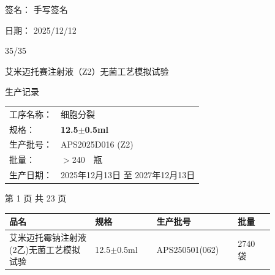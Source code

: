 \documentclass[UTF8,10pt,a4paper,fontset=fandol]{ctexart}
\newcommand{\fieldvalue}[1]{#1}
\newcommand{\handwritten}[1]{#1}
\begin{document}
\vspace{1em}

\noindent 签名：%
\fieldvalue{\handwritten{手写签名}}

\noindent 日期：%
\fieldvalue{\handwritten{2025/12/12}}

\hfill
\fieldvalue{\handwritten{35/35}}

\newpage

\begin{center}
{\Large 艾米迈托赛注射液（Z2）无菌工艺模拟试验\par}
\vspace{0.4em}
{\Large 生产记录\par}
\end{center}

\vspace{1.5em}

\noindent
\begin{tabular}{@{}l l@{}}
工序名称：&
\fieldvalue{细胞分裂}
\\[1.2em]
规格：&
\fieldvalue{\textbf{12.5$\pm$0.5ml}}
\\[1.2em]
生产批号：&
\fieldvalue{\handwritten{APS2025D016 (Z2)}}
\\[1.2em]
批量：&
\fieldvalue{\handwritten{$>$240}}\ \ 瓶
\\[1.2em]
生产日期：&
\fieldvalue{\handwritten{2025年12月13日}}
\quad 至 \quad
\fieldvalue{\handwritten{2027年12月13日}}
\end{tabular}

\vfill

\begin{center}
第 1 页 共 23 页
\end{center}

\newpage

\noindent
\begin{tabular}{|p{0.29\linewidth}|p{0.20\linewidth}|p{0.25\linewidth}|p{0.12\linewidth}|}
\hline
品名 & 规格 & 生产批号 & 批量 \\
\hline
\fieldvalue{艾米迈托霉钠注射液(2乙)无菌工艺模拟试验}
&
\fieldvalue{12.5$\pm$0.5ml}
&
\fieldvalue{\handwritten{APS250501(062)}}
&
\fieldvalue{\handwritten{2740}} 袋
\\
\hline
\end{tabular}
\end{document}
